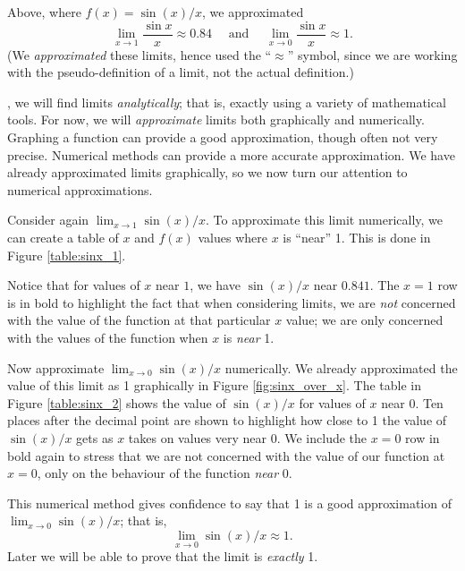 Above, where $f(x) = \sin(x)/x$, we approximated 
\[
\lim_{x\to 1} \frac{\sin x}{x} \approx 0.84 \quad \text{ and } \quad \lim_{x\to 0}\frac{\sin x}{x} \approx 1.
\]
(We \textit{approximated} these limits, hence used the ``$\approx$'' symbol, since we are working with the pseudo-definition of a limit, not the actual definition.)

, we will find limits \textit{analytically}; that is, exactly using a variety of mathematical tools. For now, we will \textit{approximate} limits both graphically and numerically. Graphing a function can provide a good approximation, though often not very precise. Numerical methods can provide a more accurate approximation. We have already approximated limits graphically, so we now turn our attention to numerical approximations.


Consider again $\lim_{x\to 1}\sin (x)/x$. To approximate this limit numerically, we can create a table of $x$ and $f(x)$ values where $x$ is ``near'' 1. This is done in Figure \ref{table:sinx_1}.\par

Notice that for values of $x$ near $1$, we have $\sin (x)/x$ near $0.841$. The $x=1$ row is in bold to highlight the fact that when considering limits, we are \textit{not} concerned with the value of the function at that particular $x$ value; we are only concerned with the values of the function when $x$ is \textit{near} 1. 



Now approximate $\lim_{x\to 0} \sin(x)/x$ numerically. We already approximated the value of this limit as 1 graphically in Figure \ref{fig:sinx_over_x}. The table in Figure \ref{table:sinx_2} shows the value of $\sin(x)/x$ for values of $x$ near 0. Ten places after the decimal point are shown to highlight how close to 1 the value of $\sin(x)/x$ gets as $x$ takes on values very near 0. We include the $x=0$ row in bold again to stress that we are not concerned with the value of our function at $x=0$, only on the behaviour of the function \textit{near} 0. 

 
This numerical method gives confidence to say that 1 is a good approximation of $\lim_{x\to 0} \sin(x)/x$; that is, 
\[
\lim_{x\to 0} \sin(x)/x \approx 1.
\]
Later we will be able to prove that the limit is \textit{exactly} 1.

